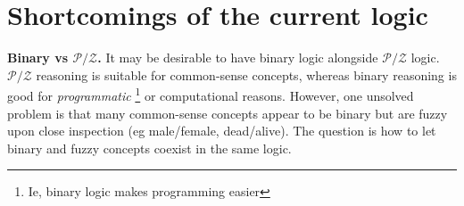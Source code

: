\section{Shortcomings of the current logic}

\textbf{Binary vs $\mathcal{P/Z}$.}  It may be desirable to have binary logic alongside $\mathcal{P/Z}$ logic.  $\mathcal{P/Z}$ reasoning is suitable for common-sense concepts, whereas binary reasoning is good for \textit{programmatic}
\footnote{Ie, binary logic makes programming easier}
or computational reasons.  However, one unsolved problem is that many common-sense concepts appear to be binary but are fuzzy upon close inspection (eg male/female, dead/alive).  The question is how to let binary and fuzzy concepts coexist in the same logic.







